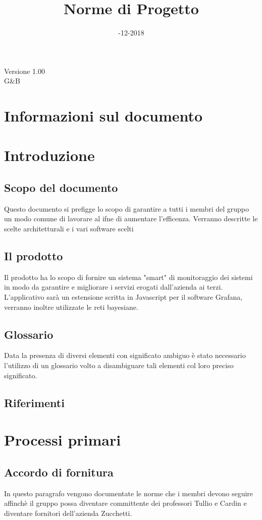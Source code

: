 \documentclass[12pt]{article}
\title{\myfont Norme di Progetto}
\date{ \myfont 04-12-2018}
\begin{document}
  \maketitle
  \begin{center}
  \huge Versione 1.00 
  \\G\&B
  \end{center}
  \newpage
  \tableofcontents
  \newpage

\section{Informazioni sul documento}


\section{Introduzione}
\subsection{Scopo del documento}
Questo documento si prefigge lo scopo di garantire a tutti i membri del gruppo un modo comune di lavorare al ifne di aumentare l'efficenza. Verranno descritte le scelte architetturali e i vari software scelti
\subsection{Il prodotto}
Il prodotto ha lo scopo di fornire un sistema "smart" di monitoraggio dei sistemi in modo da garantire e migliorare i servizi erogati dall'azienda ai terzi. L'applicativo sarà un estensione scritta in Javascript per il software Grafana, verranno inoltre utilizzate le reti bayesiane.
\subsection{Glossario}
Data la presenza di diversi elementi con significato ambiguo è stato necessario l'utilizzo di un glossario volto a disambiguare tali elementi col loro preciso significato.
\subsection{Riferimenti}

\newpage

\section{Processi primari}
\subsection{Accordo di fornitura}
In questo paragrafo vengono documentate le norme che i membri devono seguire affinchè il gruppo possa diventare committente dei professori Tullio e Cardin e diventare fornitori dell'azienda Zucchetti.
\end{document}
